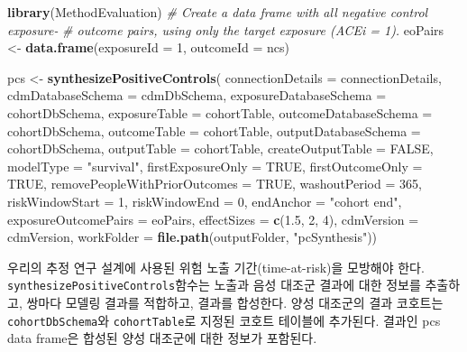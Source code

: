 \documentclass[11pt]{book}
\newenvironment{Shaded}{\begin{snugshade}}{\end{snugshade}}
\newcommand{\KeywordTok}[1]{\textcolor[rgb]{0.13,0.29,0.53}{\textbf{#1}}}
\newcommand{\DataTypeTok}[1]{\textcolor[rgb]{0.13,0.29,0.53}{#1}}
\newcommand{\DecValTok}[1]{\textcolor[rgb]{0.00,0.00,0.81}{#1}}
\newcommand{\FloatTok}[1]{\textcolor[rgb]{0.00,0.00,0.81}{#1}}
\newcommand{\StringTok}[1]{\textcolor[rgb]{0.31,0.60,0.02}{#1}}
\newcommand{\CommentTok}[1]{\textcolor[rgb]{0.56,0.35,0.01}{\textit{#1}}}
\newcommand{\OtherTok}[1]{\textcolor[rgb]{0.56,0.35,0.01}{#1}}
\newcommand{\NormalTok}[1]{#1}
\theoremstyle{definition}
\theoremstyle{definition}
\theoremstyle{definition}
\theoremstyle{remark}
\begin{document}
\begin{Shaded}
\begin{Highlighting}[]
\KeywordTok{library}\NormalTok{(MethodEvaluation)}
\CommentTok{# Create a data frame with all negative control exposure-}
\CommentTok{# outcome pairs, using only the target exposure (ACEi = 1).}
\NormalTok{eoPairs <-}\StringTok{ }\KeywordTok{data.frame}\NormalTok{(}\DataTypeTok{exposureId =} \DecValTok{1}\NormalTok{,}
                      \DataTypeTok{outcomeId =}\NormalTok{ ncs)}

\NormalTok{pcs <-}\StringTok{ }\KeywordTok{synthesizePositiveControls}\NormalTok{(}
  \DataTypeTok{connectionDetails =}\NormalTok{ connectionDetails,}
  \DataTypeTok{cdmDatabaseSchema =}\NormalTok{ cdmDbSchema,}
  \DataTypeTok{exposureDatabaseSchema =}\NormalTok{ cohortDbSchema,}
  \DataTypeTok{exposureTable =}\NormalTok{ cohortTable,}
  \DataTypeTok{outcomeDatabaseSchema =}\NormalTok{ cohortDbSchema,}
  \DataTypeTok{outcomeTable =}\NormalTok{ cohortTable,}
  \DataTypeTok{outputDatabaseSchema =}\NormalTok{ cohortDbSchema,}
  \DataTypeTok{outputTable =}\NormalTok{ cohortTable,}
  \DataTypeTok{createOutputTable =} \OtherTok{FALSE}\NormalTok{,}
  \DataTypeTok{modelType =} \StringTok{"survival"}\NormalTok{,}
  \DataTypeTok{firstExposureOnly =} \OtherTok{TRUE}\NormalTok{,}
  \DataTypeTok{firstOutcomeOnly =} \OtherTok{TRUE}\NormalTok{,}
  \DataTypeTok{removePeopleWithPriorOutcomes =} \OtherTok{TRUE}\NormalTok{,}
  \DataTypeTok{washoutPeriod =} \DecValTok{365}\NormalTok{,}
  \DataTypeTok{riskWindowStart =} \DecValTok{1}\NormalTok{,}
  \DataTypeTok{riskWindowEnd =} \DecValTok{0}\NormalTok{,}
  \DataTypeTok{endAnchor =} \StringTok{"cohort end"}\NormalTok{,}
  \DataTypeTok{exposureOutcomePairs =}\NormalTok{ eoPairs,}
  \DataTypeTok{effectSizes =} \KeywordTok{c}\NormalTok{(}\FloatTok{1.5}\NormalTok{, }\DecValTok{2}\NormalTok{, }\DecValTok{4}\NormalTok{),}
  \DataTypeTok{cdmVersion =}\NormalTok{ cdmVersion,}
  \DataTypeTok{workFolder =} \KeywordTok{file.path}\NormalTok{(outputFolder, }\StringTok{"pcSynthesis"}\NormalTok{))}
\end{Highlighting}
\end{Shaded}

우리의 추정 연구 설계에 사용된 위험 노출 기간(time-at-risk)을 모방해야
한다. \texttt{synthesizePositiveControls}함수는 노출과 음성 대조군
결과에 대한 정보를 추출하고, 쌍마다 모델링 결과를 적합하고, 결과를
합성한다. 양성 대조군의 결과 코호트는 \texttt{cohortDbSchema}와
\texttt{cohortTable}로 지정된 코호트 테이블에 추가된다. 결과인 pcs data
frame은 합성된 양성 대조군에 대한 정보가 포함된다.
\end{document}
